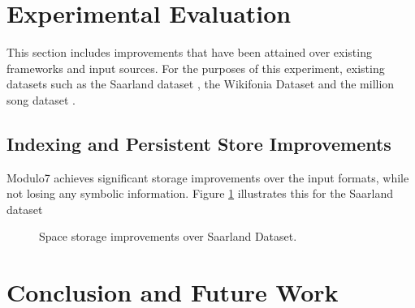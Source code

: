 \documentclass{article}
\begin{document}
\section{Experimental Evaluation}

This section includes improvements that have been attained over existing frameworks and input sources. For the purposes of this experiment, existing datasets such as the Saarland dataset \cite{saarlandmsd}, the Wikifonia Dataset \cite{WikifoniaDataset} and the million song dataset \cite{msd}. 

\subsection{Indexing and Persistent Store Improvements}

Modulo7 achieves significant storage improvements over the input formats, while not losing any symbolic information. Figure \ref{fig:storageimprovement} illustrates this for the Saarland dataset \cite{saarlandmsd}

\begin{figure}[h]
\begin{center}
{}
 \caption{Space storage improvements over Saarland Dataset.}
 \label{fig:storageimprovement}
\end{center}
 \end{figure}


\section{Conclusion and Future Work}



\end{document}

